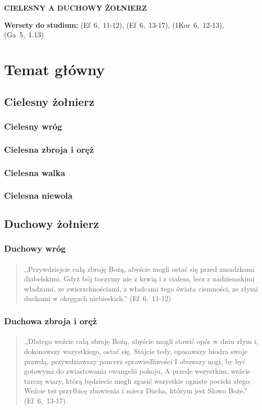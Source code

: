 \documentclass[10pt,a4paper,oneside]{article}
\begin{document}
\centerline{\textbf{\MakeUppercase{Cielesny a duchowy żołnierz}}}
\begin{center}
\textbf{Wersety do studium:} \mbox{(Ef 6, 11-12)}, \mbox{(Ef 6, 13-17)}, \mbox{(1Kor 6, 12-13)}, \mbox{(Ga 5, 1.13)}
\end{center}
\section{Temat główny}
\subsection{Cielesny żołnierz}
\subsubsection{Cielesny wróg}
\subsubsection{Cielesna zbroja i oręż}
\subsubsection{Cielesna walka}
\subsubsection{Cielesna niewola}
\subsection{Duchowy żołnierz}
\subsubsection{Duchowy wróg}
\paragraph{}
\begin{quote}
,,Przywdziejcie całą zbroję Bożą, abyście mogli ostać się przed zasadzkami diabelskimi. Gdyż bój toczymy nie z krwią i z ciałem, lecz z nadziemskimi władzami, ze zwierzchnościami, z władcami tego świata ciemności, ze złymi duchami w okręgach niebieskich.'' \mbox{(Ef 6, 11-12)}
\end{quote}
\subsubsection{Duchowa zbroja i oręż}
\paragraph{}
\begin{quote}
,,Dlatego weźcie całą zbroję Bożą, abyście mogli stawić opór w dniu złym i, dokonawszy wszystkiego, ostać się. Stójcie tedy, opasawszy biodra swoje prawdą, przywdziawszy pancerz sprawiedliwości I obuwszy nogi, by być gotowymi do zwiastowania ewangelii pokoju, A przede wszystkim, weźcie tarczę wiary, którą będziecie mogli zgasić wszystkie ogniste pociski złego; Weźcie też przyłbicę zbawienia i miecz Ducha, którym jest Słowo Boże.'' \mbox{(Ef 6, 13-17)}
\end{quote}
\end{document}
